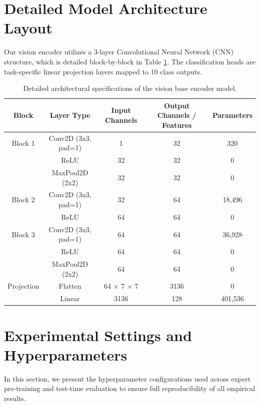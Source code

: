 \documentclass{article}
\theoremstyle{plain}
\theoremstyle{definition}
\theoremstyle{remark}
\begin{document}
\section{Detailed Model Architecture Layout}
\label{appendix:architecture}
Our vision encoder utilizes a 3-layer Convolutional Neural Network (CNN) structure, which is detailed block-by-block in Table \ref{tab:architecture_layout}. The classification heads are task-specific linear projection layers mapped to 10 class outputs.

\begin{table}[H]
\caption{Detailed architectural specifications of the vision base encoder model.}
\label{tab:architecture_layout}
\vskip 0.15in
\begin{center}
\begin{small}
\begin{sc}
\begin{tabular}{ccccc}
\toprule
Block & Layer Type & Input Channels & Output Channels / Features & Parameters \\
\midrule
Block 1 & Conv2D (3x3, pad=1) & 1 & 32 & 320 \\
        & ReLU                & 32 & 32 & 0 \\
        & MaxPool2D (2x2)     & 32 & 32 & 0 \\
\midrule
Block 2 & Conv2D (3x3, pad=1) & 32 & 64 & 18,496 \\
        & ReLU                & 64 & 64 & 0 \\
\midrule
Block 3 & Conv2D (3x3, pad=1) & 64 & 64 & 36,928 \\
        & ReLU                & 64 & 64 & 0 \\
        & MaxPool2D (2x2)     & 64 & 64 & 0 \\
\midrule
Projection & Flatten          & 64 \(\times\) 7 \(\times\) 7 & 3136 & 0 \\
           & Linear           & 3136 & 128 & 401,536 \\
\bottomrule
\end{tabular}
\end{sc}
\end{small}
\end{center}
\vskip -0.1in
\end{table}

\section{Experimental Settings and Hyperparameters}
\label{appendix:hyperparameters}
In this section, we present the hyperparameter configurations used across expert pre-training and test-time evaluation to ensure full reproducibility of all empirical results.
\end{document}

